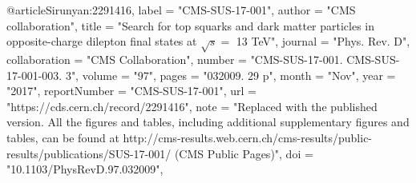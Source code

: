 @article{Sirunyan:2291416,
      label          = "CMS-SUS-17-001",
      author        = "{CMS collaboration}",
      title         = "{Search for top squarks and dark matter particles in
                       opposite-charge dilepton final states at $\sqrt{s}=$ 13
                       TeV}",
      journal       = "Phys. Rev. D",
      collaboration = "CMS Collaboration",
      number        = "CMS-SUS-17-001. CMS-SUS-17-001-003. 3",
      volume        = "97",
      pages         = "032009. 29 p",
      month         = "Nov",
      year          = "2017",
      reportNumber  = "CMS-SUS-17-001",
      url           = "https://cds.cern.ch/record/2291416",
      note          = "Replaced with the published version. All the figures and
                       tables, including additional supplementary figures and
                       tables, can be found at
                       http://cms-results.web.cern.ch/cms-results/public-results/publications/SUS-17-001/
                       (CMS Public Pages)",
      doi           = "10.1103/PhysRevD.97.032009",
}

